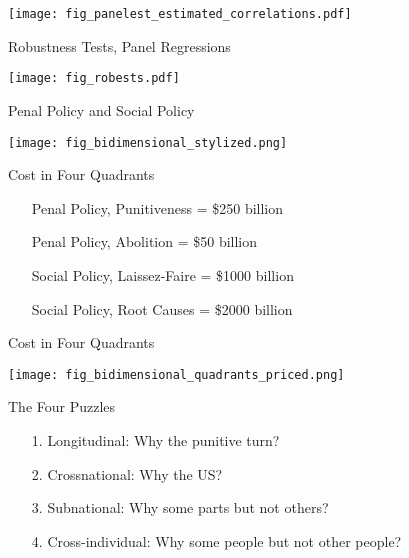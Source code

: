 \documentclass{beamer}
\begin{document}
\begin{frame}{\claimfiveq}
\begin{center}
    \texttt{[image: fig\_panelest\_estimated\_correlations.pdf]}
\end{center}
\end{frame}

\begin{frame}{Robustness Tests, Panel Regressions}
\begin{center}
    \texttt{[image: fig\_robests.pdf]}
\end{center}
\end{frame}

\begin{frame}{Penal Policy and Social Policy}
\begin{center}
    \texttt{[image: fig\_bidimensional\_stylized.png]}
\end{center}
\end{frame}

\begin{frame}{Cost in Four Quadrants}
\begin{itemize}
    \item[] Penal Policy, Punitiveness = \$250 billion 
    \item[] Penal Policy, Abolition = \$50 billion 
    \item[] Social Policy, Laissez-Faire = \$1000 billion
    \item[] Social Policy, Root Causes = \$2000 billion
\end{itemize}
\end{frame}

\begin{frame}{Cost in Four Quadrants}
\begin{center}
    \texttt{[image: fig\_bidimensional\_quadrants\_priced.png]}
\end{center}
\end{frame}

\begin{frame}{The Four Puzzles}
\begin{itemize}
    \item[1.] \alert{Longitudinal:} Why the punitive turn?
    \item[2.] \alert{Crossnational:} Why the US? 
    \item[3.] \alert{Subnational:} Why some parts but not others? 
    \item[4.] \alert{Cross-individual:} Why some people but not other people?
\end{itemize}
\end{frame}
\end{document}
